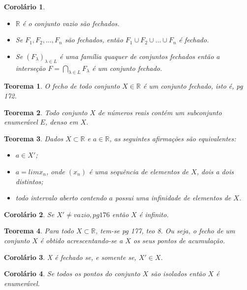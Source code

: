 \documentclass{article}
\theoremstyle{remark}
\theoremstyle{plain}
\newtheorem{theorem}{Teorema}
\theoremstyle{plain}
\newtheorem{corolary}{Corolário}
\theoremstyle{plain}
\begin{document}
    \begin{corolary}
        \begin{itemize}
            \item $\mathbb{R}$ é o conjunto vazio são fechados.
            \item Se $F_1, F_2, \dots, F_n$ são fechados, então $F_1 \cup F_2 \cup \dots \cup F_n$ é fechado.
            \item Se $ \left( F_\lambda \right)_{\lambda \in L}$ é uma família quaquer de conjuntos fechados então a interseção
                $F = \bigcap\limits_{\lambda \in L} F_\lambda$ é um conjunto fechado.
        \end{itemize}
    \end{corolary}
    \begin{theorem}
        O fecho de todo conjunto $X \in \mathbb{R}$ é um conjunto fechado, isto é, pg 172.
    \end{theorem}
    \begin{theorem}
        Todo conjunto $X$ de números reais contém um subconjunto enumerável $E$, denso em $X$.
    \end{theorem}
    \begin{theorem}
        Dados $X \subset \mathbb{R}$ e $a \in \mathbb{R}$, as seguintes afirmações são equivalentes:
        \begin{itemize}
            \item $a \in X'$;
            \item $a = lim x_n$, onde $(x_n)$ é uma sequência de elementos de $X$, dois a dois distintos;
            \item todo intervalo aberto contendo $a$ possui uma infinidade de elementos de $X$.
        \end{itemize}
    \end{theorem}
    \begin{corolary}
        Se $X' \neq vazio, pg 176$ então $X$ é infinito.
    \end{corolary}
    \begin{theorem}
        Para todo $X \subset \mathbb{R}$, tem-se pg 177, teo 8. 
        Ou seja, o fecho de um conjunto $X$ é obtido acrescentando-se a $X$ os seus pontos de acumulação.
    \end{theorem}
    \begin{corolary}
        X é fechado se, e somente se, $X' \in X$.
    \end{corolary}
    \begin{corolary}
        Se todos os pontos do conjunto $X$ são isolados então $X$ é enumerável.
    \end{corolary}
\end{document}
